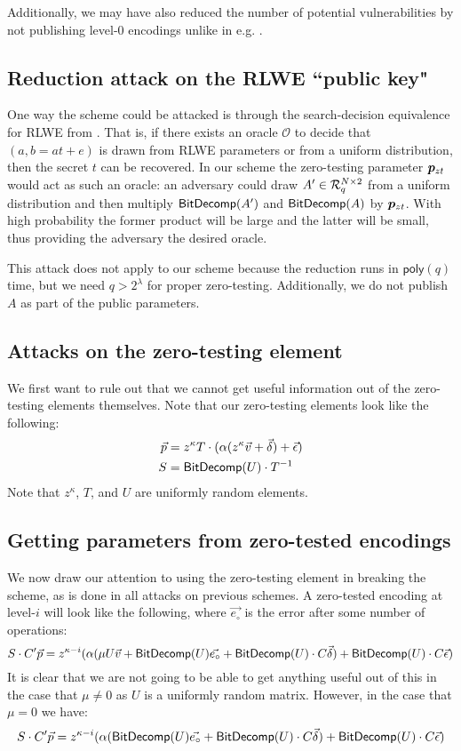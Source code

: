 Additionally, we may have also reduced the number of potential vulnerabilities by not publishing level-$0$ encodings unlike in e.g. \cite{clt}.

\subsection{Reduction attack on the RLWE ``public key"}

One way the scheme could be attacked is through the search-decision equivalence for RLWE from \cite{lpr}.  That is, if there exists an oracle $\mathcal{O}$ to decide that $(a, b = at+e)$ is drawn from RLWE parameters or from a uniform distribution, then the secret $t$ can be recovered.  In our scheme the zero-testing parameter $\bm{p}_{zt}$ would act as such an oracle: an adversary could draw $A' \in \mathcal{R}_q^{N \times 2}$ from a uniform distribution and then multiply $\mathsf{BitDecomp}(A')$ and $\mathsf{BitDecomp}(A)$ by $\bm{p}_{zt}$.  With high probability the former product will be large and the latter will be small, thus providing the adversary the desired oracle.

This attack does not apply to our scheme because the reduction runs in $\mathsf{poly}(q)$ time, but we need $q > 2^\lambda$ for proper zero-testing.  Additionally, we do not publish $A$ as part of the public parameters.

\subsection{Attacks on the zero-testing element}

We first want to rule out that we cannot get useful information out of the zero-testing elements themselves.  Note that our zero-testing elements look like the following:
\begin{align*}
\vec{p} &= z^\kappa T\cdot (\alpha (z^\kappa \vec{v} + \vec{\delta}) + \vec{\epsilon})\\
S &= \mathsf{BitDecomp}(U)\cdot T^{-1}
\end{align*}
Note that $z^\kappa$, $T$, and $U$ are uniformly random elements.

\subsection{Getting parameters from zero-tested encodings}

We now draw our attention to using the zero-testing element in breaking the scheme, as is done in all attacks on previous schemes.  A zero-tested encoding at level-$i$ will look like the following, where $\vec{e_{\circ}}$ is the error after some number of operations:
$$S\cdot C' \vec{p} = z^{\kappa-i} (\alpha (\mu U \vec{v} + \mathsf{BitDecomp}(U)\vec{e_{\circ}} + \mathsf{BitDecomp}(U)\cdot C\vec{\delta}) + \mathsf{BitDecomp}(U)\cdot C\vec{\epsilon})$$
It is clear that we are not going to be able to get anything useful out of this in the case that $\mu \not= 0$ as $U$ is a uniformly random matrix.  However, in the case that $\mu = 0$ we have:
\begin{equation}\label{eq:topleveltested}
S\cdot C'\vec{p} = z^{\kappa - i}(\alpha (\mathsf{BitDecomp}(U)\vec{e_{\circ}} + \mathsf{BitDecomp}(U)\cdot C\vec{\delta}) + \mathsf{BitDecomp}(U)\cdot C\vec{\epsilon})
\end{equation}


